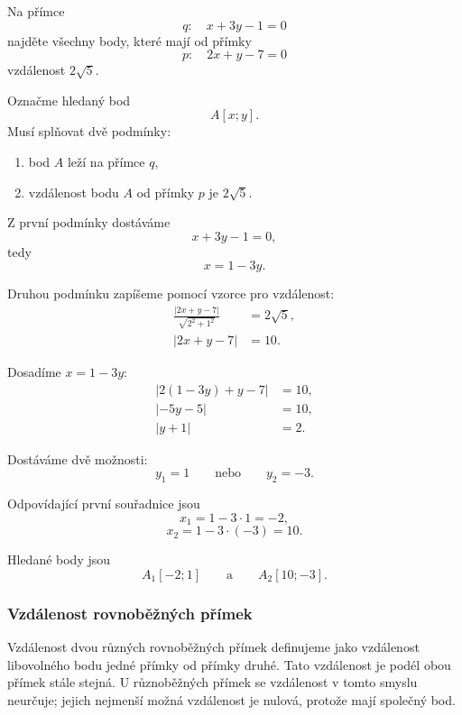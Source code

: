 \begin{example}\label{exa:Point_on_line_given_distance_from_line}
    Na přímce
    \[
        q:\quad x+3y-1=0
    \]
    najděte všechny body, které mají od přímky
    \[
        p:\quad 2x+y-7=0
    \]
    vzdálenost $2\sqrt5$.

    Označme hledaný bod
    \[
        A[x;y].
    \]
    Musí splňovat dvě podmínky:
    \begin{enumerate}
        \item bod $A$ leží na přímce $q$,
        \item vzdálenost bodu $A$ od přímky $p$ je $2\sqrt5$.
    \end{enumerate}

    Z první podmínky dostáváme
    \[
        x+3y-1=0,
    \]
    tedy
    \[
        x=1-3y.
    \]

    Druhou podmínku zapíšeme pomocí vzorce pro vzdálenost:
    \begin{align*}
        \frac{|2x+y-7|}{\sqrt{2^2+1^2}}
        &=
        2\sqrt5,\\
        |2x+y-7|&=10.
    \end{align*}

    Dosadíme $x=1-3y$:
    \begin{align*}
        |2(1-3y)+y-7|&=10,\\
        |-5y-5|&=10,\\
        |y+1|&=2.
    \end{align*}

    Dostáváme dvě možnosti:
    \[
        y_1=1
        \qquad\text{nebo}\qquad
        y_2=-3.
    \]

    Odpovídající první souřadnice jsou
    \[
        x_1=1-3\cdot1=-2,
    \]
    \[
        x_2=1-3\cdot(-3)=10.
    \]

    Hledané body jsou
    \[
        A_1[-2;1]
        \qquad\text{a}\qquad
        A_2[10;-3].
    \]
\end{example}


\subsubsection{Vzdálenost rovnoběžných přímek}
\label{subsubsec:Distance_parallel_lines}

Vzdálenost dvou různých rovnoběžných přímek definujeme jako
vzdálenost libovolného bodu jedné přímky od přímky druhé. Tato
vzdálenost je podél obou přímek stále stejná. U různoběžných přímek
se vzdálenost v tomto smyslu neurčuje; jejich nejmenší možná
vzdálenost je nulová, protože mají společný bod.

